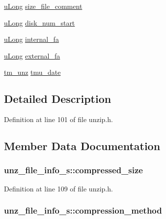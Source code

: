 \begin{DoxyCompactItemize}
\item 
\hyperlink{zconf_8h_a154b3b80120c903a368fec5f11f3007a}{u\-Long} \hyperlink{structunz__file__info__s_afa9feffb3b9c9c03e02599118d5f548e}{size\-\_\-file\-\_\-comment}
\item 
\hyperlink{zconf_8h_a154b3b80120c903a368fec5f11f3007a}{u\-Long} \hyperlink{structunz__file__info__s_ab7bfba2b7d0cdb7260a7cd9f9ccd00ff}{disk\-\_\-num\-\_\-start}
\item 
\hyperlink{zconf_8h_a154b3b80120c903a368fec5f11f3007a}{u\-Long} \hyperlink{structunz__file__info__s_aa20738bf82bca71cc950b9475b5d8c3c}{internal\-\_\-fa}
\item 
\hyperlink{zconf_8h_a154b3b80120c903a368fec5f11f3007a}{u\-Long} \hyperlink{structunz__file__info__s_ae3365fdb260668fca60bfb975b1513aa}{external\-\_\-fa}
\item 
\hyperlink{unzip_8h_a369a14c48c4b71afa6bf6cf95c6b9160}{tm\-\_\-unz} \hyperlink{structunz__file__info__s_ad52c08c65349f674b00244d81cdb1736}{tmu\-\_\-date}
\end{DoxyCompactItemize}


\subsection{Detailed Description}


Definition at line 101 of file unzip.\-h.



\subsection{Member Data Documentation}
\hypertarget{structunz__file__info__s_a35ee9d733879c87565e40a545fe46fb6}{
\subsubsection[{compressed\-\_\-size}]{ unz\-\_\-file\-\_\-info\-\_\-s\-::compressed\-\_\-size}}\label{structunz__file__info__s_a35ee9d733879c87565e40a545fe46fb6}


Definition at line 109 of file unzip.\-h.

\hypertarget{structunz__file__info__s_aaaca88f0ebec5c1cfebb436b8e70a774}{
\subsubsection[{compression\-\_\-method}]{ unz\-\_\-file\-\_\-info\-\_\-s\-::compression\-\_\-method}}\label{structunz__file__info__s_aaaca88f0ebec5c1cfebb436b8e70a774}


